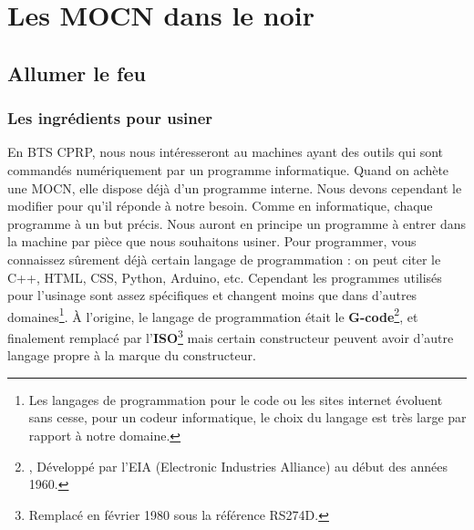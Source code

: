 \documentclass[
	11pt, %
	fleqn, %
	a4paper, %
]{LegrandOrangeBook}
\begin{document}


\part{Les MOCN dans le noir}


\chapter{Allumer le feu}

\section{Les ingrédients pour usiner}


En BTS CPRP, nous nous intéresseront au machines ayant des outils qui sont commandés numériquement par un programme informatique. Quand on achète une MOCN, elle dispose déjà d'un programme interne. Nous devons cependant le modifier pour qu'il réponde à notre besoin. Comme en informatique, chaque programme à un but précis. Nous auront en principe un programme à entrer dans la machine par pièce que nous souhaitons usiner. Pour programmer, vous connaissez sûrement déjà certain langage de programmation : on peut citer le C++, HTML, CSS, Python, Arduino, etc. Cependant les programmes utilisés pour l'usinage sont assez spécifiques et changent moins que dans d'autres domaines\footnote{Les langages de programmation pour le code ou les sites internet évoluent sans cesse, pour un codeur informatique, le choix du langage est très large par rapport à notre domaine.}. À l'origine, le langage de programmation était le \textbf{G-code}\footnote{, Développé par l'EIA (Electronic Industries Alliance) au début des années 1960.}, et finalement remplacé par l'\textbf{ISO}\footnote{Remplacé en février 1980 sous la référence RS274D.} mais certain constructeur peuvent avoir d'autre langage propre à la marque du constructeur.
\end{document}
